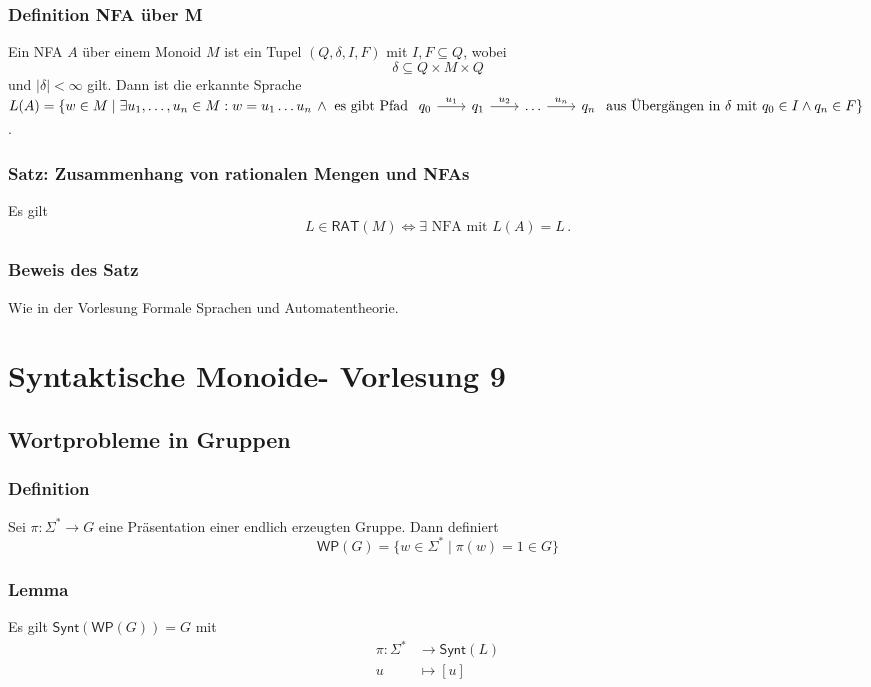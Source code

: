 \documentclass[12pt, german]{article}
\newcommand{\sigstern}{\Sigma^\ast}
\newcommand{\rat}{\mathsf{RAT}}
\newcommand{\synt}{\mathsf{Synt}}
\newcommand{\wop}{\mathsf{WP}}
\begin{document}
	\subsubsection{Definition NFA über M}
	Ein NFA $A$ über einem Monoid $M$ ist ein Tupel $(Q, \delta, I, F)$ mit $I, F \subseteq Q$, wobei $$\delta \subseteq Q \times M \times Q$$ und $|\delta| < \infty$ gilt. 
	Dann ist die erkannte Sprache $L(A) = \{w \in M \mid \exists u_1, \ldots, u_n \in M : w = u_1 \ldots u_n \, \wedge \text{ es gibt Pfad } \begin{tikzcd}[column sep=1.7pc]
		q_0\arrow{r}{u_1} &  q_1 \arrow{r}{u_2} & \ldots \arrow{r}{u_n} & q_n
	\end{tikzcd} \text{ aus Übergängen in } \delta \text{ mit } q_0 \in I \wedge q_n \in F\}$. 

	
	\subsubsection{Satz: Zusammenhang von rationalen Mengen und NFAs}
	Es gilt $$ L \in \rat(M) \iff \exists \text{ NFA mit } L(A) = L \, .$$
	
	\subsubsection{Beweis des Satz}
	Wie in der Vorlesung Formale Sprachen und Automatentheorie.
	
	\section{Syntaktische Monoide- Vorlesung 9}
	\subsection{Wortprobleme in Gruppen}
	\subsubsection{Definition}
	Sei $\pi : \sigstern \to G$ eine Präsentation einer endlich erzeugten Gruppe. Dann definiert $$\wop(G) = \{ w \in \sigstern \mid \pi(w)=1 \in G\}$$
	
	\subsubsection{Lemma}
	Es gilt $\synt(\wop(G))=G$ mit 
	\begin{align*}
		\pi : \sigstern &\to \synt(L) \\
		u &\mapsto [u]
	\end{align*}
	
\end{document}

